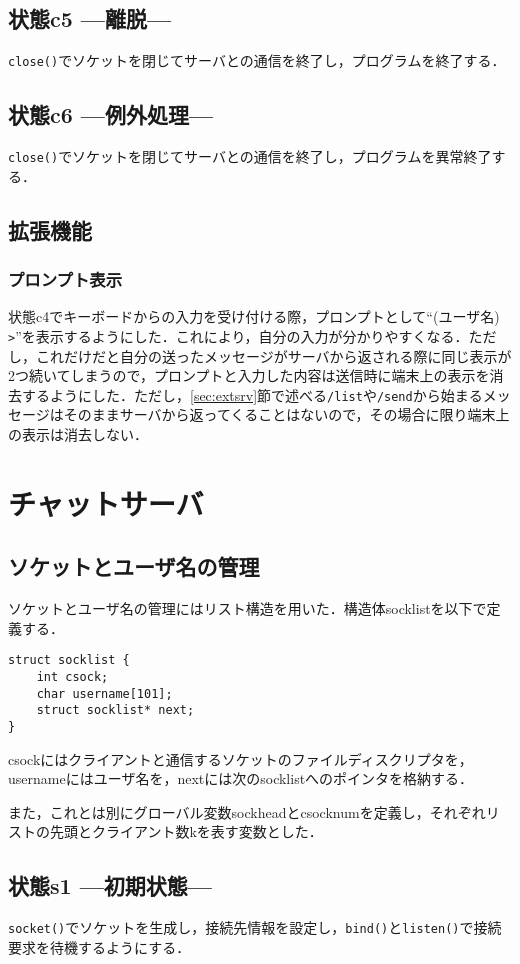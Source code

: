 \documentclass[a4j,10pt,titlepage]{jsarticle}
\begin{document}
\subsection{状態c5 ---離脱---}
\verb|close()|でソケットを閉じてサーバとの通信を終了し，プログラムを終了する．

\subsection{状態c6 ---例外処理---}
\verb|close()|でソケットを閉じてサーバとの通信を終了し，プログラムを異常終了する．

\subsection{拡張機能}
\subsubsection{プロンプト表示}
状態c4でキーボードからの入力を受け付ける際，プロンプトとして``(ユーザ名) \verb|>|''を表示するようにした．これにより，自分の入力が分かりやすくなる．ただし，これだけだと自分の送ったメッセージがサーバから返される際に同じ表示が2つ続いてしまうので，プロンプトと入力した内容は送信時に端末上の表示を消去するようにした．ただし，\ref{sec:extsrv}節で述べる\verb|/list|や\verb|/send|から始まるメッセージはそのままサーバから返ってくることはないので，その場合に限り端末上の表示は消去しない．

\section{チャットサーバ}
\subsection{ソケットとユーザ名の管理}
ソケットとユーザ名の管理にはリスト構造を用いた．構造体socklistを以下で定義する．
\begin{verbatim}
struct socklist {
    int csock;
    char username[101];
    struct socklist* next;
}
\end{verbatim}

csockにはクライアントと通信するソケットのファイルディスクリプタを，usernameにはユーザ名を，nextには次のsocklistへのポインタを格納する．

また，これとは別にグローバル変数sockheadとcsocknumを定義し，それぞれリストの先頭とクライアント数kを表す変数とした．

\subsection{状態s1 ---初期状態---}
\verb|socket()|でソケットを生成し，接続先情報を設定し，\verb|bind()|と\verb|listen()|で接続要求を待機するようにする．
\end{document}
